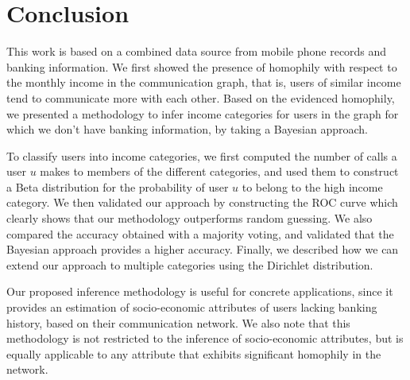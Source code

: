 \section{Conclusion}

This work is based on a combined data source
from mobile phone records and banking information.
We first showed the presence of homophily with respect to the monthly income in the
communication graph, that is, users of similar income tend to communicate more with each other. Based on the evidenced homophily, we presented a methodology to infer income categories for users in the graph for which we don't have
banking information, by taking a Bayesian approach.

To classify users into income categories, we first computed the number of calls a user $u$ makes to members of the different categories, and used them to construct a Beta distribution for the probability of user $u$ to belong to the high income category. We then validated our approach by constructing the ROC curve which clearly shows that our methodology outperforms random guessing.
We also compared the accuracy obtained with a majority voting, and validated that the
Bayesian approach provides a higher accuracy.
Finally, we described how we can extend our approach to multiple categories using the Dirichlet distribution.

Our proposed inference methodology is useful for concrete applications, since it provides an estimation of socio-economic attributes of users lacking banking history, based on their communication network. We also note that this methodology is not restricted to the inference of socio-economic attributes, but is equally applicable to any attribute that exhibits significant homophily in the network.


%
%
%
%
%
%

